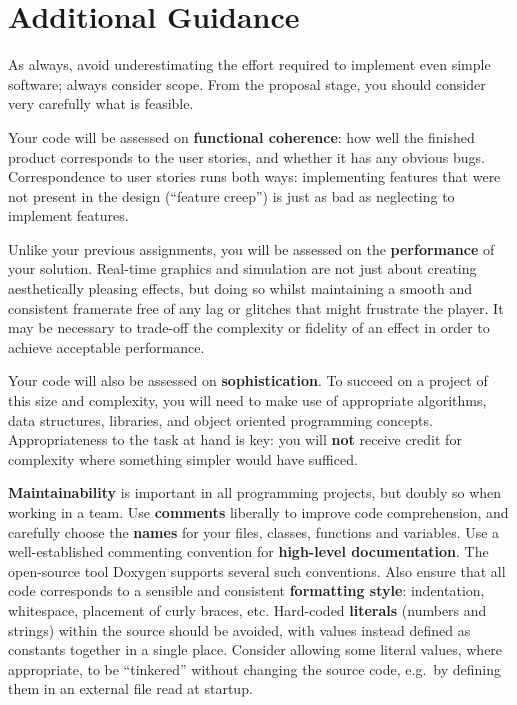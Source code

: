 \documentclass{../fal_assignment}
\begin{document}
\section*{Additional Guidance}

As always, avoid underestimating the effort required to implement even simple software; always consider scope.
From the proposal stage, you should consider very carefully what is feasible.

Your code will be assessed on \textbf{functional coherence}:
how well the finished product corresponds to the user stories,
and whether it has any obvious bugs.
Correspondence to user stories runs both ways:
implementing features that were not present in the design (``feature creep'')
is just as bad as neglecting to implement features.

Unlike your previous assignments,
you will be assessed on the \textbf{performance} of your solution.
Real-time graphics and simulation are not just about creating aesthetically pleasing effects,
but doing so whilst maintaining a smooth and consistent framerate free of any lag or glitches that might frustrate the player.
It may be necessary to trade-off the complexity or fidelity of an effect
in order to achieve acceptable performance.

Your code will also be assessed on \textbf{sophistication}.
To succeed on a project of this size and complexity,
you will need to make use of appropriate algorithms, data structures, libraries, and object oriented programming concepts.
Appropriateness to the task at hand is key:
you will \textbf{not} receive credit for complexity  
where something simpler would have sufficed.

\textbf{Maintainability} is important in all programming projects,
but doubly so when working in a team.
Use \textbf{comments} liberally to improve code comprehension,
and carefully choose the \textbf{names} for your files, classes, functions and variables.
Use a well-established commenting convention
for \textbf{high-level documentation}.
The open-source tool Doxygen supports several such conventions.
Also ensure that all code corresponds to a sensible and consistent \textbf{formatting style}:
indentation, whitespace, placement of curly braces, etc.
Hard-coded \textbf{literals} (numbers and strings) within the source should be avoided,
with values instead defined as constants together in a single place.
Consider allowing some literal values, where appropriate, to be ``tinkered'' without changing the source code,
e.g.\ by defining them in an external file read at startup.
\end{document}
